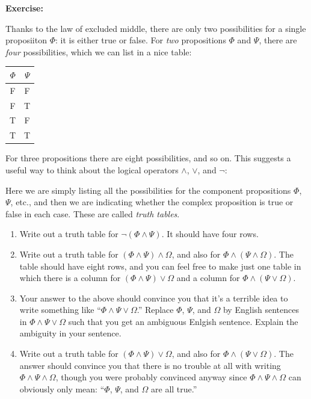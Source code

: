 \documentclass[12pt]{article}
\newcommand{\AND}{\wedge}
\newcommand{\OR}{\vee}
\newcommand{\ex}[1]{\textbf{Exercise:}\begin{adjustwidth}{2em}{}#1\end{adjustwidth}}
\def\pA{\Phi}
\def\pB{\Psi}
\def\pC{\Omega}
\begin{document}
\ex{
Thanks to the law of excluded middle, there are only two possibilities for a single proposiiton $\pA$: it is either true or false.
For \emph{two} propositions $\pA$ and $\pB$, there are \emph{four} possibilities, which we can list in a nice table:
\begin{center}
\begin{tabular}{|c|c|}
\hline
$\pA$ & $\pB$ \\ \hline
F     & F     \\ \hline
F     & T     \\ \hline
T     & F     \\ \hline
T     & T     \\ \hline
\end{tabular}
\end{center}
For three propositions there are eight possibilities, and so on.
This suggests a useful way to think about the logical operators $\AND$, $\OR$, and $\neg$:
\begin{center}
\truthtablefour{$\pA\AND\pB$}{F}{F}{F}{T}
\sp
\truthtablefour{$\pA\OR\pB$}{F}{T}{T}{T}
\sp
\truthtabletwo{$\neg\pA$}{T}{F}
\end{center}
Here we are simply listing all the possibilities for the component propositions $\pA$, $\pB$, etc.,
and then we are indicating whether the complex proposition is true or false in each case. These are called \emph{truth tables}.
\begin{enumerate}
\item
Write out a truth table for $\neg(\pA\AND\pB)$. It should have four rows.

\item
Write out a truth table for $(\pA\AND\pB)\AND\pC$, and also for $\pA\AND(\pB\AND\pC)$.
The table should have eight rows, and you can feel free to make just one table in which 
there is a column for $(\pA\AND\pB)\OR\pC$ and a column for $\pA\AND(\pB\OR\pC)$.

\item
Your answer to the above should convince you that it's a terrible idea to write something like ``$\pA\AND\pB\OR\pC$.''
Replace $\pA$, $\pB$, and $\pC$ by English sentences in $\pA\AND\pB\OR\pC$ such that you get an ambiguous Enlgish sentence.
Explain the ambiguity in your sentence.

\item
Write out a truth table for $(\pA\AND\pB)\OR\pC$, and also for $\pA\AND(\pB\OR\pC)$.
The answer should convince you that there is no trouble at all with writing $\pA\AND\pB\AND\pC$,
though you were probably convinced anyway since $\pA\AND\pB\AND\pC$ can obviously only mean:
``$\pA$, $\pB$, and $\pC$ are all true.''


\end{enumerate}}
\end{document}
